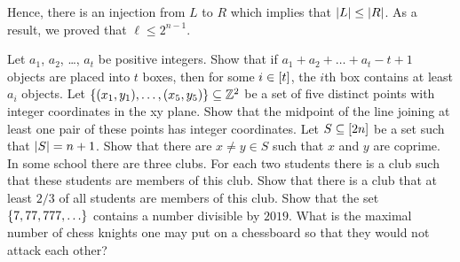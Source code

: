 \begin{chapterendexercises}
\begin{solution}
      Hence, there is an injection from $L$ to $R$ which implies that
      $\left|{L}\right| \le \left|{R}\right|$.
      As a result, we proved that $\ell \le 2^{n - 1}$.
    \end{solution}
  \exercise[recommended] Let $a_1$, $a_2$, \dots, $a_t$ be positive integers. Show that
    if $a_1 + a_2 + \dots + a_t - t + 1$ objects are placed into $t$ boxes,
    then for some $i \in {[{t}]}$, the $i$th box contains at least $a_i$ objects.
  \exercise Let $\set{(x_1,y_1), \dots, (x_5, y_5)} \subseteq \Z^2$ be a
    set of five distinct points with integer coordinates in the xy plane. Show
    that the midpoint of the line joining at least one pair of these points has
    integer coordinates.
  \exercise Let $S \subseteq {[{2n}]}$ be a set such that 
    $\left|{S}\right| = n + 1$. Show
    that there are $x \neq y \in S$ such that $x$ and $y$ are coprime.
  \exercise[recommended] In some school there are three clubs. For each two
    students there is a club such that these students are  members of this club.
    Show that there is a club that at least $2 / 3$ of all students are members
    of this club.
  \exercise Show that the set $\set{7, 77, 777, \dots}$ contains a number
    divisible by $2019$.
  \exercise What is the maximal number of chess knights one may put on a
    chessboard so that they would not attack each other?
\end{chapterendexercises}
